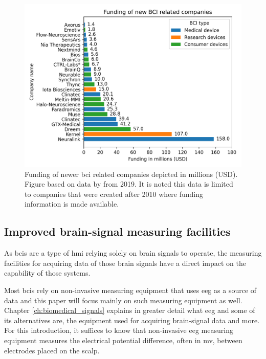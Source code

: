\begin{figure}[ht]
    \centering
    \includegraphics[width=\linewidth]{images/introduction/funding.png}
    \captionsetup{width=0.9\linewidth}
    \captionsetup{justification=centering}
    \caption{Funding of newer \gls{bci} related companies depicted in millions (USD).\\Figure based on data by \citet{bci_money} from 2019. It is noted this data is limited to companies that were created after 2010 where funding information is made available.}
    \label{fig:bci_money}
\end{figure}



\subsection{Improved brain-signal measuring facilities}
\label{subsec:bci_gaining_popularity_better_measuring}


As \glspl{bci} are a type of \gls{hmi} relying solely on brain signals to operate, the measuring facilities for acquiring data of those brain signals have a direct impact on the capability of those systems.

Most \glspl{bci} rely on non-invasive measuring equipment that uses \gls{eeg} as a source of data and this paper will focus mainly on such measuring equipment as well.
Chapter \ref{ch:biomedical_signals} explains in greater detail what \gls{eeg} and some of its alternatives are, the equipment used for acquiring brain-signal data and more.
For this introduction, it suffices to know that non-invasive \gls{eeg} measuring equipment measures the electrical potential difference, often in \gls{mv}, between electrodes placed on the scalp.

